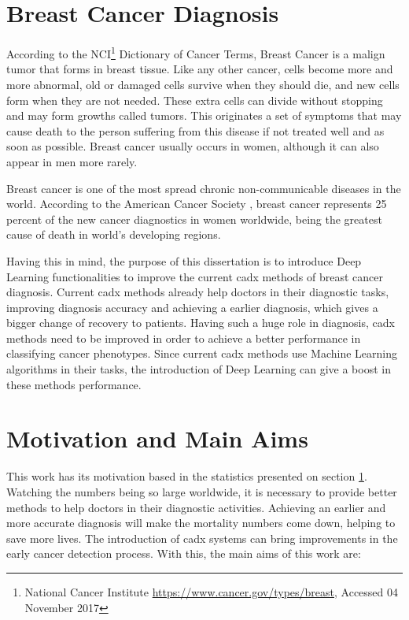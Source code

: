 \documentclass[
  twoside,
  11pt, a4paper,
  footinclude=true,
  headinclude=true,
  cleardoublepage=empty
]{scrbook}
\begin{document}
    \section{Breast Cancer Diagnosis} \label{intro:case-study}
      According to the NCI\footnote{National Cancer Institute \href{https://www.cancer.gov/types/breast}{https://www.cancer.gov/types/breast}, Accessed 04 November 2017} Dictionary of Cancer Terms, Breast Cancer is a malign tumor that forms in breast tissue. Like any other cancer, cells become more and more abnormal, old or damaged cells survive when they should die, and new cells form when they are not needed. These extra cells can divide without stopping and may form growths called tumors. This originates a set of symptoms that may cause death to the person suffering from this disease if not treated well and as soon as possible. Breast cancer usually occurs in women, although it can also appear in men more rarely.

      Breast cancer is one of the most spread chronic non-communicable diseases in the world. According to the American Cancer Society \cite{american2015global}, breast cancer represents 25 percent of the new cancer diagnostics in women worldwide, being the greatest cause of death in world's developing regions.

      Having this in mind, the purpose of this dissertation is to introduce Deep Learning functionalities to improve the current \gls{cadx} methods of breast cancer diagnosis. Current \gls{cadx} methods already help doctors in their diagnostic tasks, improving diagnosis accuracy and achieving a earlier diagnosis, which gives a bigger change of recovery to patients. Having such a huge role in diagnosis, \gls{cadx} methods need to be improved in order to achieve a better performance in classifying cancer phenotypes. Since current \gls{cadx} methods use Machine Learning algorithms in their tasks, the introduction of Deep Learning can give a boost in these methods performance.

    \section{Motivation and Main Aims} \label{intro:objectives}
      This work has its motivation based in the statistics presented on section \ref{intro:case-study}. Watching the numbers being so large worldwide, it is necessary to provide better methods to help doctors in their diagnostic activities. Achieving an earlier and more accurate diagnosis will make the mortality numbers come down, helping to save more lives. The introduction of \gls{cadx} systems can bring improvements in the early cancer detection process. With this, the main aims of this work are:
\end{document}
